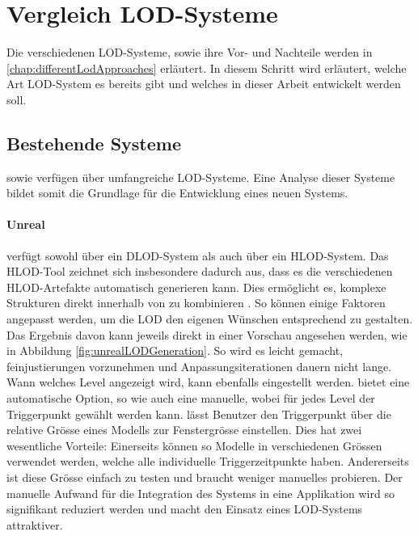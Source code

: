 \section{Vergleich LOD-Systeme}
Die verschiedenen LOD-Systeme, sowie ihre Vor- und Nachteile werden in \autoref{chap:differentLodApproaches} erläutert. In diesem Schritt wird erläutert, welche Art LOD-System es bereits gibt und welches in dieser Arbeit entwickelt werden soll.

\subsection{Bestehende Systeme}
\label{chap:existingSolutions}

 sowie  verfügen über umfangreiche LOD-Systeme. Eine Analyse dieser Systeme bildet somit die Grundlage für die Entwicklung eines neuen Systems.

\paragraph{Unreal}

 verfügt sowohl über ein DLOD-System als auch über ein HLOD-System. Das HLOD-Tool zeichnet sich insbesondere dadurch aus, dass es die verschiedenen HLOD-Artefakte automatisch generieren kann. Dies ermöglicht es, komplexe Strukturen direkt innerhalb von  zu kombinieren \cite{unrealProxyLod}.
So können einige Faktoren angepasst werden, um die LOD den eigenen Wünschen entsprechend zu gestalten. Das Ergebnis davon kann jeweils direkt in einer Vorschau angesehen werden, wie in Abbildung \ref{fig:unrealLODGeneration}. So wird es leicht gemacht, feinjustierungen vorzunehmen und Anpassungsiterationen dauern nicht lange.
Wann welches Level angezeigt wird, kann ebenfalls eingestellt werden.  bietet eine automatische Option, so wie auch eine manuelle, wobei für jedes Level der Triggerpunkt gewählt werden kann.
 lässt Benutzer den Triggerpunkt über die relative Grösse eines Modells zur Fenstergrösse einstellen. Dies hat zwei wesentliche Vorteile: Einerseits können so Modelle in verschiedenen Grössen verwendet werden, welche alle individuelle Triggerzeitpunkte haben. Andererseits ist diese Grösse einfach zu testen und braucht weniger manuelles probieren.
Der manuelle Aufwand für die Integration des Systems in eine Applikation wird so signifikant reduziert werden und macht den Einsatz eines LOD-Systems attraktiver.

